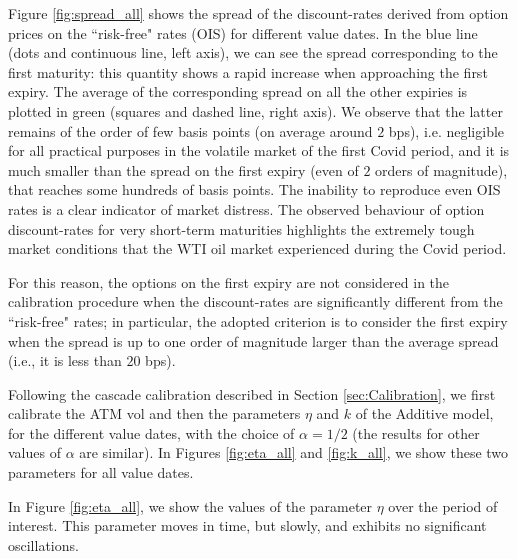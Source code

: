 \documentclass[12pt]{article}
\theoremstyle{definition}
\theoremstyle{remark}
\numberwithin{theorem}{section}
\numberwithin{proposition}{section}
\numberwithin{lemma}{section}
\numberwithin{corollary}{section}
\numberwithin{definition}{section}
\numberwithin{remark}{section}
\numberwithin{example}{section}
\begin{document}
Figure \ref{fig:spread_all} shows the spread of the discount-rates derived from option prices on the ``risk-free" rates (OIS) for different value dates. In the blue line (dots and continuous line, left axis), we can see the spread corresponding to the first maturity: this quantity shows a rapid increase when approaching the first expiry. The average of the corresponding spread on all the other expiries is plotted in green (squares and dashed line, right axis). We observe that the latter remains of the order of few basis points (on average around $2$ bps), i.e. negligible for all practical purposes in the volatile market of the first Covid period, and it is much smaller than the spread on the first expiry (even of $2$ orders of magnitude), that reaches some hundreds of basis points. 
The inability to reproduce even OIS rates is a clear indicator of market distress. 
The observed behaviour of option discount-rates for very short-term maturities highlights the extremely tough market conditions that the WTI oil market experienced during the Covid period.

\smallskip

For this reason, the options on the first expiry are not considered in the calibration procedure
when the discount-rates are significantly different from the ``risk-free" rates; in particular, the adopted criterion is to consider the first expiry
when the spread is up to one order of magnitude larger than the average spread (i.e., it is less than $20$ bps).

\smallskip

Following the cascade calibration described in Section \ref{sec:Calibration}, we first calibrate the ATM vol and then the parameters $\eta$ and $k$ of the Additive model, for the different value dates, with the choice of $\alpha=1/2$ (the results for other values of $\alpha$ are similar). 
In Figures \ref{fig:eta_all} and \ref{fig:k_all}, we show these two parameters for all value dates.

\smallskip

In Figure \ref{fig:eta_all}, we show the values of the parameter $\eta$ over the period of interest. 
This parameter moves in time, but slowly, and exhibits no significant oscillations.
\end{document}
